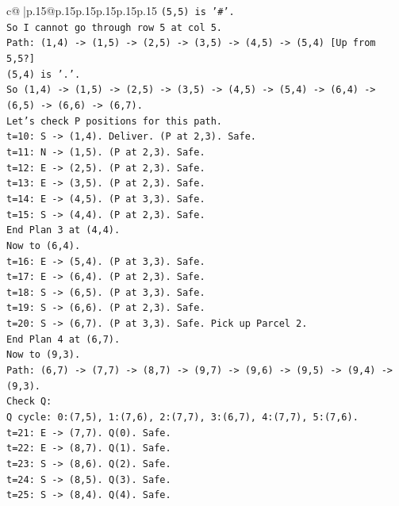 \documentclass{article}
\begin{document}
{\begin{supertabular}{c@{$\;$}|p{.15\linewidth}@{}p{.15\linewidth}p{.15\linewidth}p{.15\linewidth}p{.15\linewidth}p{.15\linewidth}}
{{{\texttt{(5,5) is '\#'.} \\
\texttt{So I cannot go through row 5 at col 5.} \\
\texttt{Path: (1,4) {-}> (1,5) {-}> (2,5) {-}> (3,5) {-}> (4,5) {-}> (5,4) {[}Up from 5,5?{]}} \\
\texttt{(5,4) is '.'.} \\
\texttt{So (1,4) {-}> (1,5) {-}> (2,5) {-}> (3,5) {-}> (4,5) {-}> (5,4) {-}> (6,4) {-}> (6,5) {-}> (6,6) {-}> (6,7).} \\
\texttt{Let's check P positions for this path.} \\
\texttt{t=10: S {-}> (1,4). Deliver. (P at 2,3). Safe.} \\
\texttt{t=11: N {-}> (1,5). (P at 2,3). Safe.} \\
\texttt{t=12: E {-}> (2,5). (P at 2,3). Safe.} \\
\texttt{t=13: E {-}> (3,5). (P at 2,3). Safe.} \\
\texttt{t=14: E {-}> (4,5). (P at 3,3). Safe.} \\
\texttt{t=15: S {-}> (4,4). (P at 2,3). Safe.} \\
\texttt{End Plan 3 at (4,4).} \\
\texttt{Now to (6,4).} \\
\texttt{t=16: E {-}> (5,4). (P at 3,3). Safe.} \\
\texttt{t=17: E {-}> (6,4). (P at 2,3). Safe.} \\
\texttt{t=18: S {-}> (6,5). (P at 3,3). Safe.} \\
\texttt{t=19: S {-}> (6,6). (P at 2,3). Safe.} \\
\texttt{t=20: S {-}> (6,7). (P at 3,3). Safe. Pick up Parcel 2.} \\
\texttt{End Plan 4 at (6,7).} \\
\texttt{Now to (9,3).} \\
\texttt{Path: (6,7) {-}> (7,7) {-}> (8,7) {-}> (9,7) {-}> (9,6) {-}> (9,5) {-}> (9,4) {-}> (9,3).} \\
\texttt{Check Q:} \\
\texttt{Q cycle: 0:(7,5), 1:(7,6), 2:(7,7), 3:(6,7), 4:(7,7), 5:(7,6).} \\
\texttt{t=21: E {-}> (7,7). Q(0). Safe.} \\
\texttt{t=22: E {-}> (8,7). Q(1). Safe.} \\
\texttt{t=23: S {-}> (8,6). Q(2). Safe.} \\
\texttt{t=24: S {-}> (8,5). Q(3). Safe.} \\
\texttt{t=25: S {-}> (8,4). Q(4). Safe.} \\
}}}
\end{supertabular}}
\end{document}
